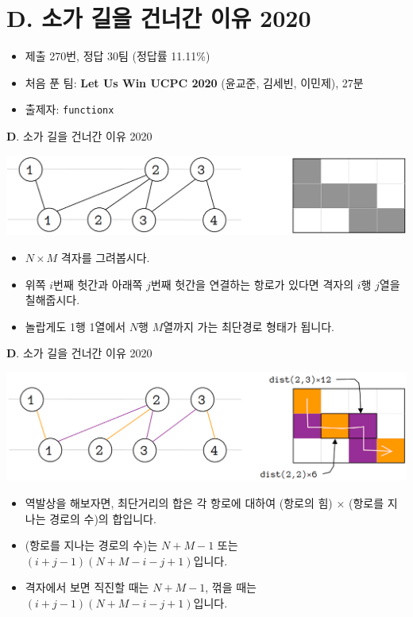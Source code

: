 \section{D. 소가 길을 건너간 이유 2020}

\begin{frame} %
    \begin{itemize}
        \item 제출 270번, 정답 30팀 (정답률 11.11\%)
        \item 처음 푼 팀: \textbf{Let Us Win UCPC 2020} (윤교준, 김세빈, 이민제), 27분
        \item 출제자: \texttt{functionx}
    \end{itemize}
\end{frame}

\begin{frame}{\textbf{D}. 소가 길을 건너간 이유 2020}
    \begin{center}
        \includegraphics[width=0.8\linewidth]{../images/cow-fly/D-1.png}
    \end{center}
    \begin{itemize}
        \item $N \times M$ 격자를 그려봅시다.
        \item 위쪽 $i$번째 헛간과 아래쪽 $j$번째 헛간을 연결하는 항로가 있다면 격자의 $i$행 $j$열을 칠해줍시다.
        \item 놀랍게도 1행 1열에서 $N$행 $M$열까지 가는 최단경로 형태가 됩니다.
    \end{itemize}
\end{frame}

\begin{frame}{\textbf{D}. 소가 길을 건너간 이유 2020}
    \begin{center}
        \includegraphics[width=0.8\linewidth]{../images/cow-fly/D-2.png}
    \end{center}
    \begin{itemize}
        \item 역발상을 해보자면, 최단거리의 합은 각 항로에 대하여 (항로의 힘) × (항로를 지나는 경로의 수)의 합입니다.
        \item (항로를 지나는 경로의 수)는 $N+M-1$ 또는 $(i+j-1)(N+M-i-j+1)$입니다.
        \item 격자에서 보면 직진할 때는 $N+M-1$, 꺾을 때는 $(i+j-1)(N+M-i-j+1)$입니다.
    \end{itemize}
\end{frame}

